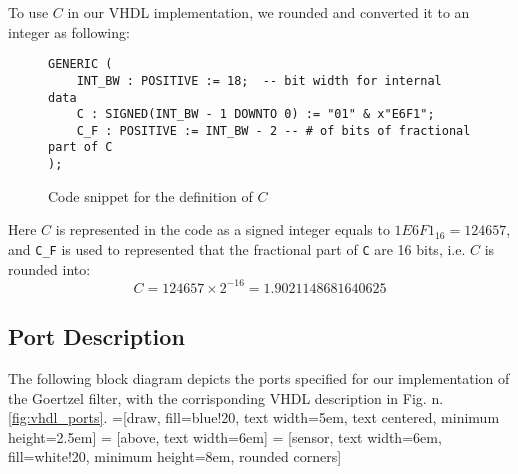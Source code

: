 To use $C$ in our VHDL implementation, we rounded and converted it to an integer as following:

\lstset{language=VHDL}
\begin{figure}[H]\begin{lstlisting}
GENERIC (
    INT_BW : POSITIVE := 18;  -- bit width for internal data
    C : SIGNED(INT_BW - 1 DOWNTO 0) := "01" & x"E6F1";
    C_F : POSITIVE := INT_BW - 2 -- # of bits of fractional part of C
);
\end{lstlisting}
\caption{Code snippet for the definition of $C$}
\end{figure}

Here $C$ is represented in the code as a signed integer equals to $1E6F1_{16} = 124657$, and \texttt{C\_F} is used to represented that the fractional part of \texttt{C} are 16 bits, i.e. $C$ is rounded into:
\[
C = 124657 \times 2^{-16} = 1.9021148681640625
\]

\subsection{Port Description}

The following block diagram depicts the ports specified for our implementation of the Goertzel filter, with the corrisponding VHDL description in Fig. n. \ref{fig:vhdl_ports}.
=[draw, fill=blue!20, text width=5em, 
text centered, minimum height=2.5em]
 = [above, text width=6em]
 = [sensor, text width=6em, fill=white!20, 
minimum height=8em, rounded corners]
\def\blockdist{2.3}
\def\edgedist{1}
\begin{center}
\end{center}





